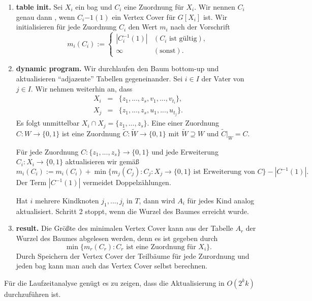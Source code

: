 \begin{enumerate}
    \item \textbf{table init.} Sei \(X_i\) ein bag und \(C_i\) eine Zuordnung für \(X_i\). Wir nennen \(C_i\) genau dann , wenn \(C_i{-1}(1)\) ein Vertex Cover für \(G[X_i]\) ist. Wir initialisieren für jede Zuordnung \(C_i\) den Wert \(m_i\) nach der Vorschrift
    \[
     m_i(C_i) :=
     \begin{cases}
       |C_i^{-1}(1)| & (C_i \text{ ist gültig}), \\
       \infty & (\text{sonst}).
     \end{cases}
    \]

    \item \textbf{dynamic program.} Wir durchlaufen den Baum bottom-up und aktualisieren "`adjazente"' Tabellen gegeneinander. Sei \(i \in I\) der Vater von \(j \in I\). Wir nehmen weiterhin an, dass
    \begin{eqnarray*}
      X_i &=& \{ z_1, ..., z_s, v_1, ..., v_{t_i} \}, \\
      X_j &=& \{ z_1, ..., z_s, u_1, ..., u_{t_j} \}. 
    \end{eqnarray*}
    Es folgt unmittelbar \(X_i \cap X_j = \{ z_1, ..., z_s \}\). Eine  einer Zuordnung \(C : W \to \{0,1\}\) ist eine Zuordnung \(\widetilde{C} : \widetilde{W} \to \{0,1\}\) mit \(\widetilde{W} \supseteq W\) und \(\widetilde{C}|_W = C\).

    Für jede Zuordnung \(C : \{ z_1, ..., z_s \} \to \{0,1\}\) und jede Erweiterung \(C_i : X_i \to \{0,1\}\) aktualisieren wir gemäß
    \[
      m_i(C_i) := m_i(C_i) + \min \{ m_j(C_j) : C_j : X_j \to \{0,1\} \text{ ist Erweiterung von } C \} - | C^{-1}(1) |.
    \]
    Der Term \(| C^{-1}(1) |\) vermeidet Doppelzählungen.

    Hat \(i\) mehrere Kindknoten \(j_1, ..., j_l\) in \(T\), dann wird \(A_i\) für jedes Kind analog aktualisiert. Schritt 2 stoppt, wenn die Wurzel des Baumes erreicht wurde.

  \item \textbf{result.} Die Größte des minimalen Vertex Cover kann aus der Tabelle \(A_r\) der Wurzel des Baumes abgelesen werden, denn es ist gegeben durch
  \[ \min \{ m_r(C_r) : C_r \text{ ist eine Zuordnung für } X_i \}. \]
  Durch Speichern der Vertex Cover der Teilbäume für jede Zurordnung und jeden bag kann man auch das Vertex Cover selbst berechnen.
  \end{enumerate}

  Für die Laufzeitanalyse genügt es zu zeigen, dass die Aktualisierung in \(O(2^kk)\) durchzuführen ist.

